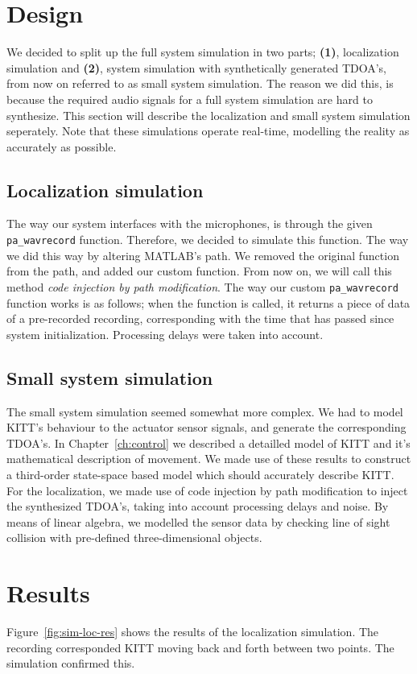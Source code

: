 \documentclass[11pt,titlepage]{report}
\begin{document}
\section{Design}
We decided to split up the full system simulation in two parts; \textbf{(1)}, localization simulation and \textbf{(2)}, system simulation with synthetically generated TDOA's, from now on referred to as small system simulation. The reason we did this, is because the required audio signals for a full system simulation are hard to synthesize. This section will describe the localization and small system simulation seperately. Note that these simulations operate real-time, modelling the reality as accurately as possible.

\subsection{Localization simulation}
The way our system interfaces with the microphones, is through the given \texttt{pa\_wavrecord} function. Therefore, we decided to simulate this function. The way we did this way by altering MATLAB's path. We removed the original function from the path, and added our custom function. From now on, we will call this method \textit{code injection by path modification}. The way our custom \texttt{pa\_wavrecord} function works is as follows; when the function is called, it returns a piece of data of a pre-recorded recording, corresponding with the time that has passed since system initialization. Processing delays were taken into account.

\subsection{Small system simulation}
The small system simulation seemed somewhat more complex. We had to model KITT's behaviour to the actuator sensor signals, and generate the corresponding TDOA's. In Chapter~\ref{ch:control} we described a detailled model of KITT and it's mathematical description of movement. We made use of these results to construct a third-order state-space based model which should accurately describe KITT. For the localization, we made use of code injection by path modification to inject the synthesized TDOA's, taking into account processing delays and noise. By means of linear algebra, we modelled the sensor data by checking line of sight collision with pre-defined three-dimensional objects.

\section{Results}
Figure~\ref{fig:sim-loc-res} shows the results of the localization simulation. The recording corresponded KITT moving back and forth between two points. The simulation confirmed this.
\end{document}
